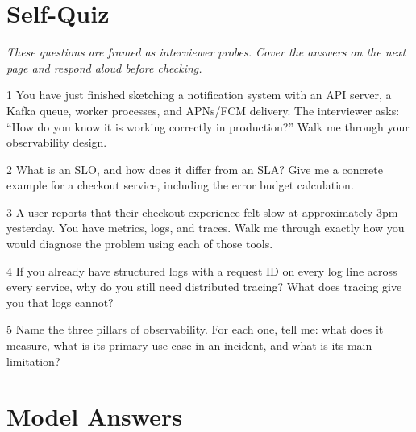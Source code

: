 \documentclass[11pt,a4paper]{article}
\begin{document}
\newpage
\section{Self-Quiz}

\textit{These questions are framed as interviewer probes. Cover the answers on the next page and respond aloud before checking.}

\begin{quizbox}{1}
  You have just finished sketching a notification system with an API server, a Kafka queue, worker processes, and APNs/FCM delivery. The interviewer asks: ``How do you know it is working correctly in production?'' Walk me through your observability design.
\end{quizbox}

\begin{quizbox}{2}
  What is an SLO, and how does it differ from an SLA? Give me a concrete example for a checkout service, including the error budget calculation.
\end{quizbox}

\begin{quizbox}{3}
  A user reports that their checkout experience felt slow at approximately 3pm yesterday. You have metrics, logs, and traces. Walk me through exactly how you would diagnose the problem using each of those tools.
\end{quizbox}

\begin{quizbox}{4}
  If you already have structured logs with a request ID on every log line across every service, why do you still need distributed tracing? What does tracing give you that logs cannot?
\end{quizbox}

\begin{quizbox}{5}
  Name the three pillars of observability. For each one, tell me: what does it measure, what is its primary use case in an incident, and what is its main limitation?
\end{quizbox}

\newpage
\section*{Model Answers}
\end{document}

